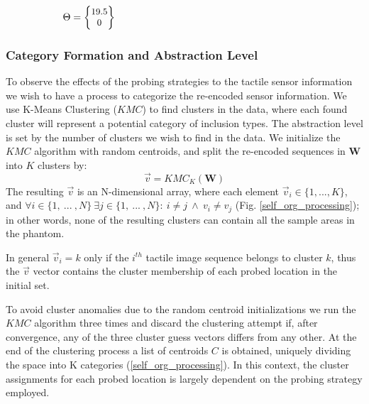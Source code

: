\begin{figure}[]
\begin{subfigure}[b]{.38\textwidth}
		\caption{$\Theta = \small{\begin{Bmatrix}19.5\\ 0\end{Bmatrix}}$}
		\label{rawnabs:d19_5}
	\end{subfigure}
	\caption{}
	\label{rawnabs}
\end{figure}

\subsubsection{Category Formation and Abstraction Level}\label{sec_clustering}
To observe the effects of the probing strategies to the tactile sensor information we wish to have a process to 
categorize the re-encoded sensor information. We use K-Means Clustering ($KMC$) to find clusters in the data, 
where each found cluster will represent a potential category of inclusion types. The abstraction level is set by the
number of clusters we wish to find in the data. 
We initialize the $KMC$ algorithm with random centroids, and split the re-encoded sequences in $\mathbf{W}$ into $K$ 
clusters by:
\begin{equation}
\vec{v} = KMC_{K}(\mathbf{W})
\end{equation}
The resulting $\vec{v}$ is an N-dimensional array, where each element $\vec{v}_i\in\{1, ..., K\}$, 
and $\forall i\in \{1,\ ...\ , N\}\ \exists j\in \{1,\ ...\ , N\}:\ i\neq j\ \land\ v_i\neq v_j$ 
(Fig. \ref{self_org_processing}); in other words, none of the resulting clusters can contain all the sample 
areas in the phantom. 

In general $\vec{v}_i=k$ only if the $i^{th}$ tactile image sequence belongs to cluster $k$, thus the $\vec{v}$ 
vector contains the cluster membership of each probed location in the initial set. 

To avoid cluster anomalies due to the random centroid initializations we run the $KMC$ algorithm three times 
and discard the clustering attempt if, after convergence, any of the three cluster guess vectors differs from 
any other. At the end of the clustering process a list of centroids $C$ is obtained, uniquely dividing the 
space into K categories (\ref{self_org_processing}). In this context, the cluster assignments for each probed 
location is largely dependent on the probing strategy employed. 

